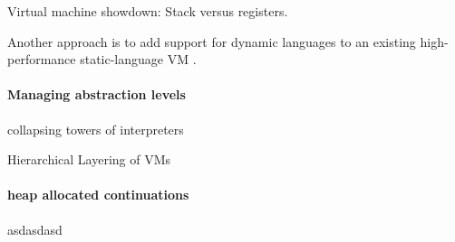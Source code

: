 Virtual machine showdown: Stack versus registers.

Another approach is to add support for dynamic languages to an
existing high-performance static-language VM \cite{stJITdyn:12,
  dynStatComp:12}.

\paragraph{Managing abstraction levels}
collapsing towers of interpreters \cite{collapse:17}

Hierarchical Layering of VMs \cite{layering:09}


\paragraph{heap allocated continuations}
asdasdasd \cite{whatever:19, compWithContLLVM:16}














